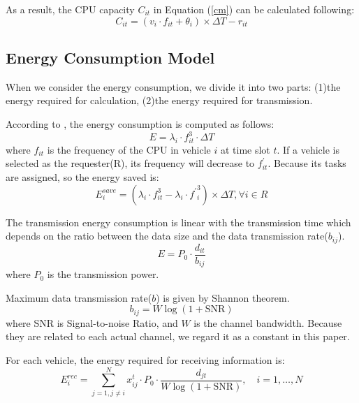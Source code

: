 \documentclass[conference]{IEEEtran}
\begin{document}
As a result, the CPU capacity $C_{it}$ in Equation (\ref{cm}) can be calculated following:
\begin{equation}
	C_{it} = (v_i \cdot f_{it} + \theta_i)   \times \Delta T 
	- r_{it}
	\label{cf}
\end{equation}

\subsection{Energy Consumption Model}
	When we consider the energy consumption, we divide it into two parts: (1)the energy required for calculation, (2)the energy required for transmission. 
	
	According to \cite{efv}\cite{vf}\cite{3940}\cite{4039}, the energy consumption is computed as follows:
\begin{equation}
	E=\lambda_{i} \cdot f_{it}^{3} \cdot \Delta T
	\label{ef}
\end{equation}
where $f_ {it}$ is the frequency of the CPU in vehicle $i$ at time slot $t$. If a vehicle is selected as the requester(R), its frequency will decrease to $f^ \prime _ {it}$. Because its tasks are assigned, so the energy saved  is:
\begin{equation}
	E_{i}^{save}
	=( \lambda_{i} \cdot f_{it}^{3} -
	\lambda_{i} \cdot{f^{\prime}}_{i}^{3} ) \times \Delta T
	, 
	\forall i \in R
\end{equation}

The transmission energy consumption is linear with the transmission time which depends on the ratio between the data size and the data transmission rate($b_{ij}$). 
\begin{equation}
	E = P_0 \cdot \frac{d_{it}}{b_{ij}}
\end{equation} 
where $P_0$ is the transmission power.

Maximum data transmission rate($b$) is given by Shannon theorem. 
\begin{equation}
	b_{ij} = W\log (1 + \text{SNR})
\end{equation}
where SNR is Signal-to-noise Ratio, and $W$ is the channel bandwidth. Because they are related to each actual channel, we regard it as a constant in this paper.

For each vehicle, the energy required for receiving information is:
\begin{equation}
	E_{i}^{r e c}=\sum_{j =1, j \ne i}^{N} x _{ij}^{t} \cdot P_0 \cdot \frac{d_{jt}}{W\log (1 + \text{SNR})}, 
	\quad  i = 1, \dots ,N
\end{equation}
\end{document}
